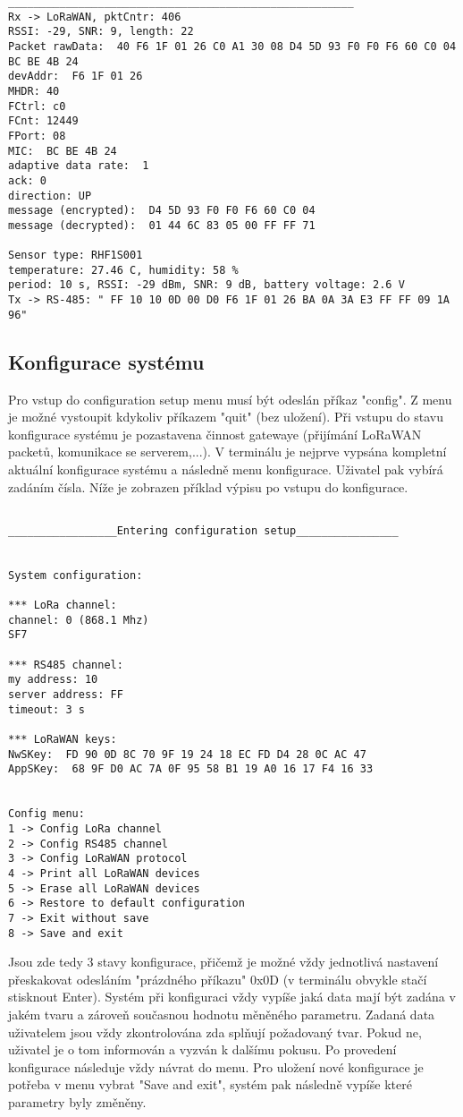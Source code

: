 \begin{lstlisting}
______________________________________________________
Rx -> LoRaWAN, pktCntr: 406
RSSI: -29, SNR: 9, length: 22
Packet rawData:  40 F6 1F 01 26 C0 A1 30 08 D4 5D 93 F0 F0 F6 60 C0 04 BC BE 4B 24
devAddr:  F6 1F 01 26
MHDR: 40
FCtrl: c0
FCnt: 12449
FPort: 08
MIC:  BC BE 4B 24
adaptive data rate:  1
ack: 0
direction: UP
message (encrypted):  D4 5D 93 F0 F0 F6 60 C0 04
message (decrypted):  01 44 6C 83 05 00 FF FF 71

Sensor type: RHF1S001
temperature: 27.46 C, humidity: 58 %
period: 10 s, RSSI: -29 dBm, SNR: 9 dB, battery voltage: 2.6 V
Tx -> RS-485: " FF 10 10 0D 00 D0 F6 1F 01 26 BA 0A 3A E3 FF FF 09 1A 96"
\end{lstlisting}

\subsection{Konfigurace systému}
Pro vstup do configuration setup menu musí být odeslán příkaz "config". Z menu je možné vystoupit kdykoliv příkazem "quit" (bez uložení). 
Při vstupu do stavu konfigurace systému je pozastavena činnost gatewaye (přijímání LoRaWAN packetů, komunikace se serverem,...).
V terminálu je nejprve vypsána kompletní aktuální konfigurace systému a následně menu konfigurace. Uživatel pak vybírá zadáním čísla.
Níže je zobrazen příklad výpisu po vstupu do konfigurace.
\\

\begin{lstlisting}

_________________Entering configuration setup________________


System configuration:

*** LoRa channel: 
channel: 0 (868.1 Mhz)
SF7

*** RS485 channel: 
my address: 10
server address: FF
timeout: 3 s

*** LoRaWAN keys: 
NwSKey:  FD 90 0D 8C 70 9F 19 24 18 EC FD D4 28 0C AC 47
AppSKey:  68 9F D0 AC 7A 0F 95 58 B1 19 A0 16 17 F4 16 33


Config menu:
1 -> Config LoRa channel
2 -> Config RS485 channel
3 -> Config LoRaWAN protocol
4 -> Print all LoRaWAN devices
5 -> Erase all LoRaWAN devices
6 -> Restore to default configuration
7 -> Exit without save
8 -> Save and exit
\end{lstlisting}



Jsou zde tedy 3 stavy konfigurace, přičemž je možné vždy jednotlivá nastavení přeskakovat odesláním "prázdného příkazu" 0x0D (v terminálu obvykle stačí stisknout Enter). Systém při konfiguraci vždy vypíše jaká data mají být zadána v jakém tvaru a zároveň současnou hodnotu měněného parametru. Zadaná data uživatelem jsou vždy zkontrolována zda splňují požadovaný tvar. Pokud ne, uživatel je o tom informován a vyzván k dalšímu pokusu.
Po provedení konfigurace následuje vždy návrat do menu. Pro uložení nové konfigurace je potřeba v menu vybrat "Save and exit", systém pak následně vypíše které parametry byly změněny.

